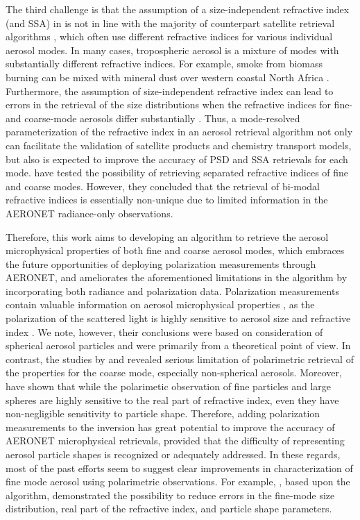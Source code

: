 The third challenge is that the assumption of a size-independent refractive
index (and SSA) in \Dub is not in line with the majority of counterpart
satellite retrieval algorithms \citep[e.g.,][]{Mishchenko07, Hasekamp11,
Martonchik09}, which often use different refractive indices
for various individual aerosol modes. In many cases, tropospheric aerosol is a
mixture of modes with substantially different refractive indices. For example,
smoke from biomass burning can be mixed with mineral dust over western coastal
North Africa \citep{Yang13}. Furthermore, the assumption of
size-independent refractive index can lead to errors in the retrieval of the
size distributions when the refractive indices for fine- and coarse-mode
aerosols differ substantially \citep{Dubovik00b, Chowdhary01}.
Thus, a mode-resolved parameterization of the refractive index in an aerosol
retrieval algorithm not only can facilitate the validation of satellite
products and chemistry transport models, but also is expected to improve the
accuracy of PSD and SSA retrievals for each mode. \citep{Dubovik00b} have
tested the possibility of retrieving separated refractive indices of fine and
coarse modes. However, they concluded that the retrieval of bi-modal refractive
indices is essentially non-unique due to limited information in the AERONET
radiance-only observations. 

Therefore, this work aims to developing an algorithm to retrieve the aerosol
microphysical properties of both fine and coarse aerosol modes,
which embraces the future opportunities of
deploying polarization measurements through AERONET, and ameliorates the
aforementioned limitations in the \Dub algorithm by incorporating both
radiance and polarization data. Polarization measurements contain valuable
information on aerosol microphysical properties \citep{Mishchenko97},
as the polarization of the scattered light is highly sensitive to aerosol size
and refractive index \citep{Hansen74, Mishchenko02}. We note, however, their
conclusions were based on consideration of
spherical aerosol particles and were primarily from a theoretical point of
view. In contrast, the studies by \citet{Dubovik06} and \citet{Deuze93,
Deuze01} revealed serious limitation of polarimetric retrieval of the properties
for the coarse mode, especially non-spherical aerosols. Moreover, \citet{Dubovik06}
have shown that while the polarimetic observation of fine particles and large
spheres are highly sensitive to the real part of refractive index, even they have
non-negligible sensitivity to particle shape. Therefore, adding polarization
measurements to the inversion has great potential to improve the accuracy of
AERONET microphysical retrievals, provided that the difficulty of representing
aerosol particle shapes is recognized or adequately addressed. In these
regards, most of the past efforts seem to suggest clear improvements in
characterization of fine mode aerosol using polarimetric observations. For
example, \citet{Li09}, based upon the \Dub algorithm, demonstrated
the possibility to reduce errors in the fine-mode size distribution, real part
of the refractive index, and particle shape parameters. 

